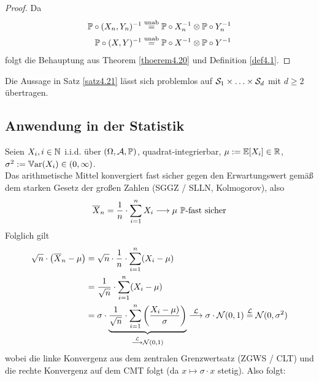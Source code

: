 \begin{proof}
	Da
	\begin{align*}
		\P\circ (X_n,Y_n)^{-1}&\stackeq{\text{unab}}\P\circ X_n^{-1}\otimes\P\circ Y_n^{-1}\\
		\P\circ (X,Y)^{-1}&\stackeq{\text{unab}}\P\circ X^{-1}\otimes\P\circ Y^{-1}
	\end{align*}
	folgt die Behauptung aus Theorem \ref{thoerem4.20} und Definition \ref{def4.1}.
\end{proof}

\begin{bemerkungnr}\label{bemerkung4.22}
	Die Aussage in Satz \ref{satz4.21} lässt sich problemlos auf $\S_1\times\ldots\times\S_d$ mit $d\geq2$ übertragen.
\end{bemerkungnr}

\subsection{Anwendung in der Statistik}
Seien $X_i,i\in\N$ i.i.d. über $(\Omega,\A,\P)$, quadrat-integrierbar, $\mu:=\E[X_i]\in\R$,\\ $\sigma^2:=\Var(X_i)\in(0,\infty)$.\\
Das arithmetische Mittel konvergiert fast sicher gegen den Erwartungswert gemäß dem starken Gesetz der großen Zahlen (SGGZ / SLLN, Kolmogorov), also
\begin{align*}
	\overline{X}_n=\frac{1}{n}\cdot\sum\limits_{i=1}^n X_i\stackrel{}{\longrightarrow}\mu~\P\text{-fast sicher}
\end{align*}
Folglich gilt
\begin{equation}
	\label{eqAnwendungInDerStatistik}
	\begin{aligned}
		\sqrt{n}\cdot\big(\overline{X}_n-\mu\big)
		&=\sqrt{n}\cdot\frac{1}{n}\cdot\sum\limits_{i=1}^n(X_i-\mu)\\
		&=\frac{1}{\sqrt{n}}\cdot\sum\limits_{i=1}^n(X_i-\mu)\\
		&=\sigma\cdot\underbrace{\frac{1}{\sqrt{n}}\cdot\sum\limits_{i=1}^n\left(\frac{X_i-\mu)}{\sigma}\right)}_{\stackrel{\L}{\longrightarrow}\mathcal{N}(0,1)}\stackrel{\L}{\longrightarrow}\sigma\cdot\mathcal{N}(0,1)\stackeq{\L}\mathcal{N}(0,\sigma^2)
	\end{aligned}
\end{equation}
wobei die linke Konvergenz aus dem zentralen Grenzwertsatz (ZGWS / CLT) und die rechte Konvergenz auf dem CMT folgt (da $x\mapsto\sigma\cdot x$ stetig). Also folgt:
